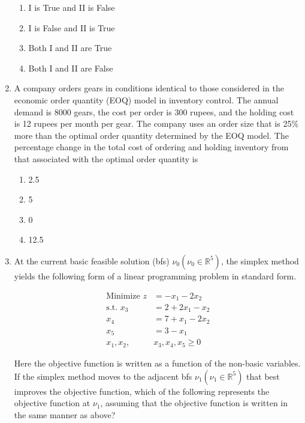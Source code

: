 \documentclass[journal,11pt,onecolumn]{IEEEtran}
\begin{document}
\begin{enumerate}[resume]
          \begin{enumerate}
              \item I is True and II is False
              \item I is False and II is True
              \item Both I and II are True
              \item Both I and II are False
          \end{enumerate}

    \item A company orders gears in conditions identical to those considered in the economic order quantity (EOQ) model in inventory control. The annual demand is 8000 gears, the cost per order is 300 rupees, and the holding cost is 12 rupees per month per gear. The company uses an order size that is 25\% more than the optimal order quantity determined by the EOQ model. The percentage change in the total cost of ordering and holding inventory from that associated with the optimal order quantity is

          \begin{enumerate}
              \item 2.5
              \item 5
              \item 0
              \item 12.5
          \end{enumerate}

    \item At the current basic feasible solution (bfs) $\nu_0 \left(\nu_0\in \mathbb{R}^5\right)$, the simplex method yields the following form of a linear programming problem in standard form.

          \begin{align}
              \text{Minimize } z    & = -x_1 - 2x_2\\
              \text{s.t. } x_3 & = 2 + 2x_1 - x_2     \\
              x_4              & = 7 + x_1 - 2x_2     \\
              x_5              & = 3 - x_1            \\
              x_1, x_2,        & x_3, x_4, x_5 \geq 0
          \end{align}

          Here the objective function is written as a function of the non-basic variables. If the simplex method moves to the adjacent bfs $\nu_1 \left(\nu_1\in \mathbb{R}^5\right)$ that best improves the objective function, which of the following represents the objective function at $\nu_1$, assuming that the objective function is written in the same manner as above?


\end{enumerate}
\end{document}
